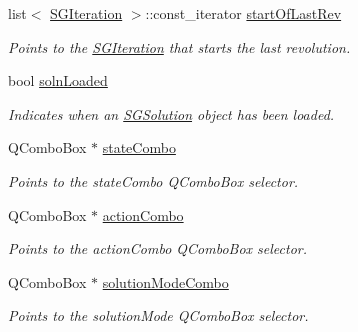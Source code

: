 \begin{DoxyCompactItemize}
\mbox{\label{classSGPlotController_aad63498d4578179dcf705070668d5480}} 
list$<$ \hyperlink{classSGIteration}{S\+G\+Iteration} $>$\+::const\+\_\+iterator \hyperlink{classSGPlotController_aad63498d4578179dcf705070668d5480}{start\+Of\+Last\+Rev}
\begin{DoxyCompactList}\small\item\em Points to the \hyperlink{classSGIteration}{S\+G\+Iteration} that starts the last revolution. \end{DoxyCompactList}\item 
\mbox{\label{classSGPlotController_a6123551bcba7707373c316617e21b70e}} 
bool \hyperlink{classSGPlotController_a6123551bcba7707373c316617e21b70e}{soln\+Loaded}
\begin{DoxyCompactList}\small\item\em Indicates when an \hyperlink{classSGSolution}{S\+G\+Solution} object has been loaded. \end{DoxyCompactList}\item 
\mbox{\label{classSGPlotController_a63ba05fcb3f660bf9fdd5fb42a0df05b}} 
Q\+Combo\+Box $\ast$ \hyperlink{classSGPlotController_a63ba05fcb3f660bf9fdd5fb42a0df05b}{state\+Combo}
\begin{DoxyCompactList}\small\item\em Points to the state\+Combo Q\+Combo\+Box selector. \end{DoxyCompactList}\item 
\mbox{\label{classSGPlotController_aa0963a19f195b384a33ba3e8d6993423}} 
Q\+Combo\+Box $\ast$ \hyperlink{classSGPlotController_aa0963a19f195b384a33ba3e8d6993423}{action\+Combo}
\begin{DoxyCompactList}\small\item\em Points to the action\+Combo Q\+Combo\+Box selector. \end{DoxyCompactList}\item 
\mbox{\label{classSGPlotController_abb1605bd670c9850af648c1a9f39f2a3}} 
Q\+Combo\+Box $\ast$ \hyperlink{classSGPlotController_abb1605bd670c9850af648c1a9f39f2a3}{solution\+Mode\+Combo}
\begin{DoxyCompactList}\small\item\em Points to the solution\+Mode Q\+Combo\+Box selector. \end{DoxyCompactList}\item 

\end{DoxyCompactItemize}
